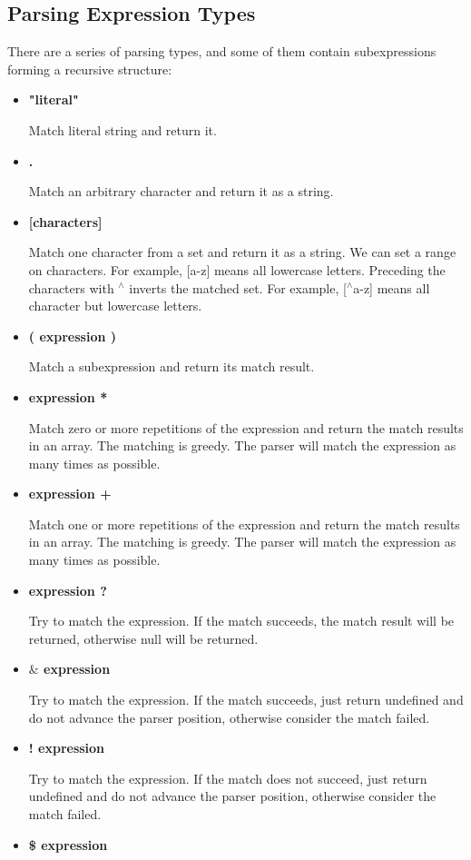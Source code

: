 \subsection {Parsing Expression Types}
There are a series of parsing types, and some of them contain subexpressions forming a recursive structure:

\begin{itemize}
\item\textbf{"literal"}

Match literal string and return it.
\item\textbf{.}

Match an arbitrary character and return it as a string.
\item\textbf{[characters]}

Match one character from a set and return it as a string. We can set a range on characters. For example, [a-z] means all lowercase letters. Preceding the characters with $^\wedge$ inverts the matched set. For example, [$^\wedge$a-z] means all character but lowercase letters.
\item\textbf{( expression )}

Match a subexpression and return its match result.
\item\textbf{expression *}

Match zero or more repetitions of the expression and return the match results in an array. The matching is greedy. The parser will match the expression as many times as possible.
\item\textbf{expression +}

Match one or more repetitions of the expression and return the match results in an array. The matching is greedy. The parser will match the expression as many times as possible.
\item\textbf{expression ?}

Try to match the expression. If the match succeeds, the match result will be returned, otherwise null will be returned.
\item\textbf{$\&$ expression}

Try to match the expression. If the match succeeds, just return undefined and do not advance the parser position, otherwise consider the match failed.
\item\textbf{! expression}

Try to match the expression. If the match does not succeed, just return undefined and do not advance the parser position, otherwise consider the match failed.
\item\textbf{\$ expression}


\end{itemize}
